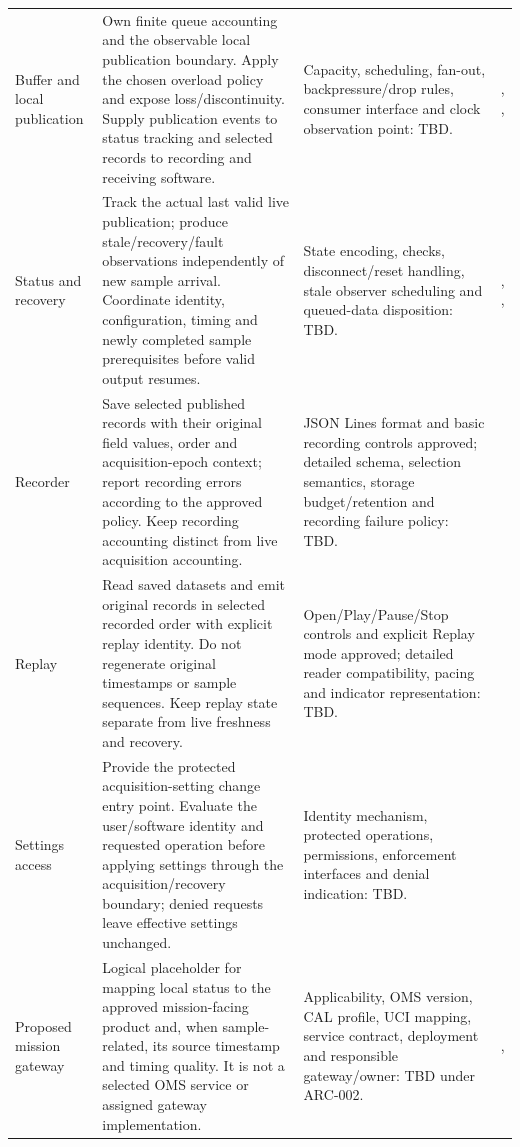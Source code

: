 \begin{landscape}
\begin{tabularx}{\linewidth}{L{3.4cm}Y Y L{3.8cm}}
\label{Component:SW-03}Buffer and local publication & Own finite queue accounting and the observable local publication boundary. Apply the chosen overload policy and expose loss/discontinuity. Supply publication events to status tracking and selected records to recording and receiving software. & Capacity, scheduling, fan-out, backpressure/drop rules, consumer interface and clock observation point: TBD. & , , \\
\label{Component:SW-04}Status and recovery & Track the actual last valid live publication; produce stale/recovery/fault observations independently of new sample arrival. Coordinate identity, configuration, timing and newly completed sample prerequisites before valid output resumes. & State encoding, checks, disconnect/reset handling, stale observer scheduling and queued-data disposition: TBD. & , , \\
\label{Component:SW-05}Recorder & Save selected published records with their original field values, order and acquisition-epoch context; report recording errors according to the approved policy. Keep recording accounting distinct from live acquisition accounting. & JSON Lines format and basic recording controls approved; detailed schema, selection semantics, storage budget/retention and recording failure policy: TBD. & \\
\label{Component:SW-06}Replay & Read saved datasets and emit original records in selected recorded order with explicit replay identity. Do not regenerate original timestamps or sample sequences. Keep replay state separate from live freshness and recovery. & Open/Play/Pause/Stop controls and explicit Replay mode approved; detailed reader compatibility, pacing and indicator representation: TBD. & \\
\label{Component:SW-07}Settings access & Provide the protected acquisition-setting change entry point. Evaluate the user/software identity and requested operation before applying settings through the acquisition/recovery boundary; denied requests leave effective settings unchanged. & Identity mechanism, protected operations, permissions, enforcement interfaces and denial indication: TBD. & \\
\label{Component:SW-08}Proposed mission gateway & Logical placeholder for mapping local status to the approved mission-facing product and, when sample-related, its source timestamp and timing quality. It is not a selected OMS service or assigned gateway implementation. & Applicability, OMS version, CAL profile, UCI mapping, service contract, deployment and responsible gateway/owner: TBD under ARC-002. & , \\
\end{tabularx}
\normalsize
\end{landscape}
